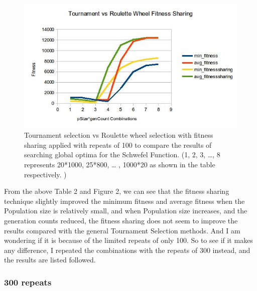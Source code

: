 \documentclass[10pt,b5paper]{article}
\begin{document}
\begin{figure}[htb]
\centering
\includegraphics[width=.9\linewidth]{./c100.jpg}
\caption{Tournament selection vs Roulette wheel selection with fitness sharing applied with repeats of 100 to compare the results of searching global optima for the Schwefel Function. (1, 2, 3, \ldots{}, 8 represents 20*1000, 25*800, \ldots{} , 1000*20 as shown in the table respectively. )}
\end{figure}
From the above Table 2 and Figure 2, we can see that the fitness sharing technique slightly improved the minimum fitness and average fitness when the Population size is relatively small, and when Population size increases, and the generation counts reduced, the fitness sharing does not seem to improve the results compared with the general Tournament Selection methods.
And I am wondering if it is because of the limited repeats of only 100. So to see if it makes any difference, I repeated the combinations with the repeats of 300 instead, and the results are listed followed. 
\subsubsection{300 repeats}
\label{sec-3-2-2}
\end{document}
